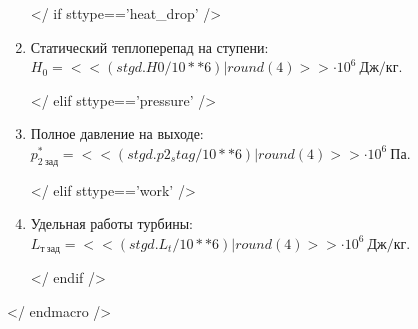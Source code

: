 \documentclass[a4paper,10pt]{article}
\begin{document}
\begin{enumerate}
        </ if sttype=='heat_drop' />
        \item Статический теплоперепад на ступени: $ H_0 = << (stgd.H0 / 10**6) | round(4) >> \cdot 10^6 \ Дж/кг $.

        </ elif sttype=='pressure' />
        \item Полное давление на выходе: $ p_{2\ зад}^* = << (stgd.p2_stag / 10**6) | round(4) >> \cdot 10^6 \ Па $.

        </ elif sttype=='work' />
        \item Удельная работы турбины: $ L_{т\ зад} = << (stgd.L_t / 10**6) | round(4)  >> \cdot 10^6 \ Дж/кг $.

        </ endif />

    \end{enumerate}
    </ endmacro />
\end{document}
